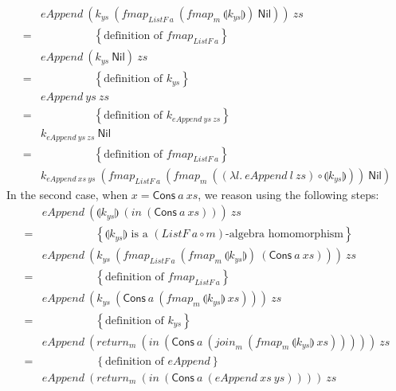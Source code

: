 \documentclass{jfp1}
\newcommand{\fold}[1]{\llparenthesis #1 \rrparenthesis}
\newcommand{\eqAnnotation}[1]{\hspace{2cm}\left\{\textrm{#1}\right\}}
\begin{document}
\begin{proof*}
\begin{displaymath}
\begin{array}{cl}
      &\mathit{eAppend}~(k_{ys}~(\mathit{fmap}_{\mathit{ListF}~a}~(\mathit{fmap}_m~\fold{k_{ys}})~\mathsf{Nil}))~\mathit{zs} \\
      =&\eqAnnotation{definition of $\mathit{fmap_{\mathit{ListF}~a}}$} \\
      &\mathit{eAppend}~(k_{ys}~\mathsf{Nil})~\mathit{zs} \\
      =&\eqAnnotation{definition of $k_{ys}$} \\
      &\mathit{eAppend}~\mathit{ys}~\mathit{zs} \\
      =&\eqAnnotation{definition of $k_{\mathit{eAppend}~\mathit{ys}~\mathit{zs}}$} \\
      &k_{\mathit{eAppend}~\mathit{ys}~\mathit{zs}}~\mathsf{Nil} \\
      =&\eqAnnotation{definition of $\mathit{fmap}_{\mathit{ListF}~a}$} \\
      &k_{\mathit{eAppend}~\mathit{xs}~\mathit{ys}}~(\mathit{fmap}_{\mathit{ListF}~a}~(\mathit{fmap}_m~((\lambda l.~\mathit{eAppend}~l~\mathit{zs}) \circ \fold{k_{ys}}))~\mathsf{Nil})
    \end{array}
  \end{displaymath}
  In the second case, when $x = \mathsf{Cons}~a~\mathit{xs}$, we
  reason using the following steps:
  \begin{displaymath}
    \begin{array}{cl}
      &\mathit{eAppend}~(\fold{k_{ys}}~(\mathit{in}~(\mathsf{Cons}~a~\mathit{xs})))~\mathit{zs} \\
      =&\eqAnnotation{$\fold{k_{ys}}$ is a $(\mathit{ListF}~a \circ m)$-algebra homomorphism} \\
      &\mathit{eAppend}~(k_{ys}~(\mathit{fmap}_{\mathit{ListF}~a}~(\mathit{fmap}_m~\fold{k_{ys}})~(\mathsf{Cons}~a~\mathit{xs})))~\mathit{zs} \\
      =&\eqAnnotation{definition of $\mathit{fmap_{\mathit{ListF}~a}}$} \\
      &\mathit{eAppend}~(k_{ys}~(\mathsf{Cons}~a~(\mathit{fmap}_m~\fold{k_{ys}}~\mathit{xs})))~\mathit{zs} \\
      =&\eqAnnotation{definition of $k_{ys}$} \\
      & \mathit{eAppend}~(\mathit{return}_m~(\mathit{in}~(\mathsf{Cons}~a~(\mathit{join}_m~(\mathit{fmap_m}~\fold{k_{ys}}~\mathit{xs})))))~\mathit{zs} \\
      =&\eqAnnotation{definition of $\mathit{eAppend}$} \\
      & \mathit{eAppend}~(\mathit{return}_m~(\mathit{in}~(\mathsf{Cons}~a~(\mathit{eAppend}~\mathit{xs}~\mathit{ys}))))~\mathit{zs} \\

\end{array}
\end{displaymath}
\end{proof*}
\end{document}
